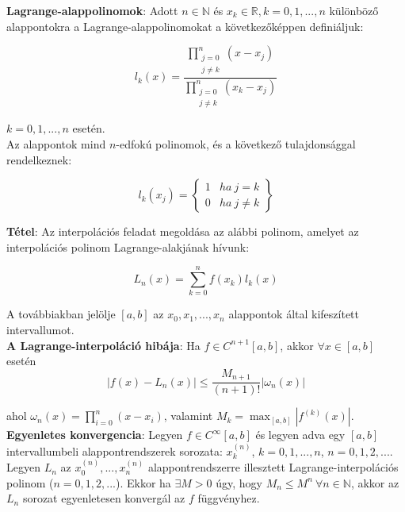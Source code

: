 \documentclass[margin=0px]{article}
\begin{document}
\noindent \textbf{Lagrange-alappolinomok}: Adott $n \in \mathbb{N}$ és $x_{k} \in \mathbb{R}, k=0,1,...,n$ különböző alappontokra
a Lagrange-alappolinomokat a következőképpen definiáljuk:

\begin{displaymath}
    l_{k}(x) =
    \frac
    {\displaystyle\prod_{\substack{j=0\\j \not = k}}^{n}(x-x_{j})}
    {\displaystyle\prod_{\substack{j=0\\j \not = k}}^{n}(x_{k}-x_{j})}
\end{displaymath}

\noindent $k=0,1, ..., n$ esetén.\\

\noindent Az alappontok mind $n$-edfokú polinomok, és a következő tulajdonsággal rendelkeznek:

\begin{displaymath}
    l_{k}(x_{j})=\left\{\begin{array}{lr}
        1 & ha \ j=k        \\
        0 & ha \ j \not = k
    \end{array}
    \right\}
\end{displaymath}

\noindent \textbf{Tétel}: Az interpolációs feladat megoldása az alábbi polinom, amelyet az interpolációs
polinom Lagrange-alakjának hívunk:

\begin{displaymath}
    L_{n}(x) = \sum_{k=0}^{n}f(x_{k})l_{k}(x)
\end{displaymath}

\noindent A továbbiakban jelölje $[a,b]$ az $x_{0}, x_{1}, ..., x_{n}$ alappontok által kifeszített intervallumot.\\

\noindent \textbf{A Lagrange-interpoláció hibája}: Ha $f \in C^{n+1}[a,b]$, akkor $\forall x \in [a,b]$ esetén
\begin{displaymath}
    |f(x) - L_{n}(x)| \leq \frac{M_{n+1}}{(n+1)!}|\omega_{n}(x)|
\end{displaymath}

\noindent ahol $\omega_{n}(x) = \displaystyle\prod_{i=0}^{n}(x-x_{i})$, valamint $M_{k} = \displaystyle\max_{[a,b]}|f^{(k)}(x)|$.\\

\noindent \textbf{Egyenletes konvergencia}: Legyen $f \in C^{\infty}[a,b]$ és legyen adva egy $[a,b]$ intervallumbeli
alappontrendszerek sorozata: $x_{k}^{(n)}$, $k=0,1,...,n$, $n=0,1,2,...$. Legyen $L_{n}$ az $x_{0}^{(n)}, ... ,x_{n}^{(n)}$
alappontrendszerre illesztett Lagrange-interpolációs polinom ($n=0,1,2,...$). Ekkor ha $\exists M>0$ úgy, hogy
$M_{n} \leq M^{n} \ \forall n \in \mathbb{N}$, akkor az $L_{n}$ sorozat egyenletesen konvergál az $f$ függvényhez.\\
\end{document}
